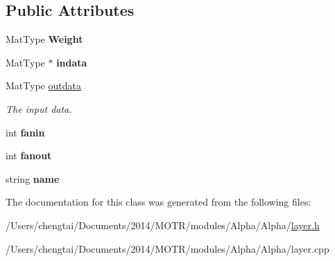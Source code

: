 \subsection*{Public Attributes}
\begin{DoxyCompactItemize}
\item 
\hypertarget{class_fully_connected_layer_a3cf0cc240abfd47b8ce17c0f9886612b}{Mat\+Type {\bfseries Weight}}\label{class_fully_connected_layer_a3cf0cc240abfd47b8ce17c0f9886612b}

\item 
\hypertarget{class_fully_connected_layer_aa06f43fdb5f8d9bd9ae2f4501d5eea72}{Mat\+Type $\ast$ {\bfseries indata}}\label{class_fully_connected_layer_aa06f43fdb5f8d9bd9ae2f4501d5eea72}

\item 
\hypertarget{class_fully_connected_layer_a9dc1c3ddd28ba88594438e9029493cee}{Mat\+Type \hyperlink{class_fully_connected_layer_a9dc1c3ddd28ba88594438e9029493cee}{outdata}}\label{class_fully_connected_layer_a9dc1c3ddd28ba88594438e9029493cee}

\begin{DoxyCompactList}\small\item\em The input data. \end{DoxyCompactList}\item 
\hypertarget{class_fully_connected_layer_aed6f8602d64c19b1086e99e00edf09d1}{int {\bfseries fanin}}\label{class_fully_connected_layer_aed6f8602d64c19b1086e99e00edf09d1}

\item 
\hypertarget{class_fully_connected_layer_a6f06e1152dedcc402cb69161293a818e}{int {\bfseries fanout}}\label{class_fully_connected_layer_a6f06e1152dedcc402cb69161293a818e}

\item 
\hypertarget{class_fully_connected_layer_a0f1df8475560dd0fd422f1da735f6993}{string {\bfseries name}}\label{class_fully_connected_layer_a0f1df8475560dd0fd422f1da735f6993}

\end{DoxyCompactItemize}


The documentation for this class was generated from the following files\+:\begin{DoxyCompactItemize}
\item 
/\+Users/chengtai/\+Documents/2014/\+M\+O\+T\+R/modules/\+Alpha/\+Alpha/\hyperlink{layer_8h}{layer.\+h}\item 
/\+Users/chengtai/\+Documents/2014/\+M\+O\+T\+R/modules/\+Alpha/\+Alpha/layer.\+cpp\end{DoxyCompactItemize}

